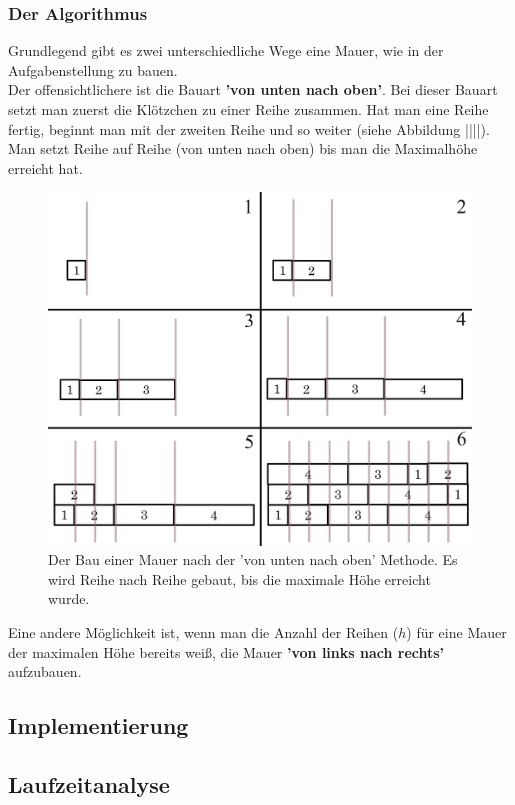 \documentclass[a4paper,12pt]{article}
\begin{document}
\subsubsection{Der Algorithmus}
Grundlegend gibt es zwei unterschiedliche Wege eine Mauer, wie in der Aufgabenstellung zu bauen.
\\[0.4cm]
Der offensichtlichere ist die Bauart \textbf{'von unten nach oben'}. Bei dieser Bauart setzt man zuerst die Klötzchen zu einer Reihe zusammen. Hat man eine Reihe fertig, beginnt man mit der zweiten Reihe und so weiter (siehe Abbildung ||||). Man setzt Reihe auf Reihe (von unten nach oben) bis man die Maximalhöhe erreicht hat.
\begin{figure}[H]
    \centering
    \includegraphics[width=1\linewidth]{Bilder/Aufgabe1/Definition_Mauerbauart_01.png}
    \caption{Der Bau einer Mauer nach der 'von unten nach oben' Methode. Es wird Reihe nach Reihe gebaut, bis die maximale Höhe erreicht wurde.}
\end{figure}

Eine andere Möglichkeit ist, wenn man die Anzahl der Reihen ($h$) für eine Mauer der maximalen Höhe bereits weiß, die Mauer \textbf{'von links nach rechts'} aufzubauen.

\subsection{Implementierung}

\subsection{Laufzeitanalyse}
\end{document}
